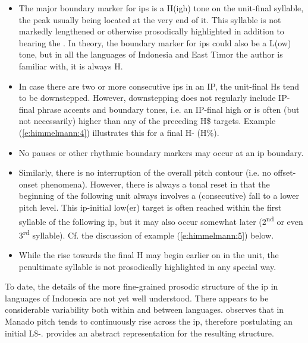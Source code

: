\documentclass[output=paper
,modfonts
,nonflat]{langsci/langscibook}
\begin{document}
\begin{itemize}
	\item The major boundary marker for ips is a H(igh) tone on the unit-final syllable, the peak usually being located at the very end of it. This syllable is not markedly lengthened or otherwise prosodically highlighted in addition to bearing the . In theory, the boundary marker for ips could also be a L(ow) tone, but in all the  languages of Indonesia and East Timor the author is familiar with, it is always H.
	\item In case there are two or more consecutive ips in an IP, the unit-final Hs tend to be downstepped. However, downstepping does not regularly include IP-final phrase accents and boundary tones, i.e. an IP-final high  or  is often (but not necessarily) higher than any of the preceding H\$ targets. Example (\ref{e:himmelmann:4}) illustrates this for a final H- (H\%).
	\item No pauses or other rhythmic boundary markers may occur at an ip boundary.
	\item Similarly, there is no interruption of the overall pitch contour (i.e. no offset-onset phenomena). However, there is always a tonal reset in that the beginning of the following unit always involves a (consecutive) fall to a lower pitch level. This ip-initial low(er) target is often reached within the first syllable of the following ip, but it may also occur somewhat later (2\textsuperscript{nd} or even 3\textsuperscript{rd} syllable). Cf. the discussion of example (\ref{e:himmelmann:5}) below.
	\item While the rise towards the final H may begin earlier on in the unit, the penultimate syllable is not prosodically highlighted in any special way.
\end{itemize}

To date, the details of the more fine-grained prosodic structure of the ip in  languages of Indonesia are not yet well understood. There appears to be considerable variability both within and between languages. \cite{Stoel2005, Stoel2007} observes that in Manado  pitch tends to continuously rise across the ip, therefore postulating an initial L\$-.  provides an abstract representation for the resulting structure.\\
\end{document}
